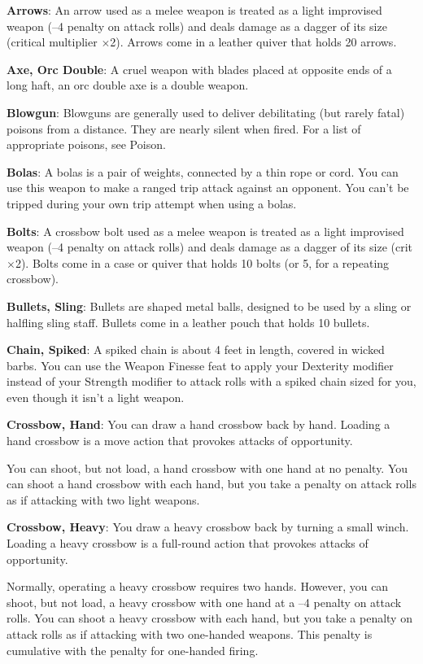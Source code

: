 \textbf{Arrows}: An arrow used as a melee weapon is treated as a light improvised weapon (--4 penalty on attack rolls) and deals damage as a dagger of its size (critical multiplier \mbox{$\times$}2). Arrows come in a leather quiver that holds 20 arrows.
		
\textbf{Axe, Orc Double}: A cruel weapon with blades placed at opposite ends of a long haft, an orc double axe is a double weapon.
		
\textbf{Blowgun}: Blowguns are generally used to deliver debilitating (but rarely fatal) poisons from a distance. They are nearly silent when fired. For a list of appropriate poisons, see Poison.
		
\textbf{Bolas}: A bolas is a pair of weights, connected by a thin rope or cord. You can use this weapon to make a ranged trip attack against an opponent. You can't be tripped during your own trip attempt when using a bolas.
		
\textbf{Bolts}: A crossbow bolt used as a melee weapon is treated as a light improvised weapon (--4 penalty on attack rolls) and deals damage as a dagger of its size (crit \mbox{$\times$}2). Bolts come in a case or quiver that holds 10 bolts (or 5, for a repeating crossbow). 
		
\textbf{Bullets, Sling}: Bullets are shaped metal balls, designed to be used by a sling or halfling sling staff. Bullets come in a leather pouch that holds 10 bullets.
		
\textbf{Chain, Spiked}: A spiked chain is about 4 feet in length, covered in wicked barbs. You can use the Weapon Finesse feat to apply your Dexterity modifier instead of your Strength modifier to attack rolls with a spiked chain sized for you, even though it isn't a light weapon.
		
\textbf{Crossbow, Hand}: You can draw a hand crossbow back by hand. Loading a hand crossbow is a move action that provokes attacks of opportunity.
		
You can shoot, but not load, a hand crossbow with one hand at no penalty. You can shoot a hand crossbow with each hand, but you take a penalty on attack rolls as if attacking with two light weapons.
		
\textbf{Crossbow, Heavy}: You draw a heavy crossbow back by turning a small winch. Loading a heavy crossbow is a full-round action that provokes attacks of opportunity.
		
Normally, operating a heavy crossbow requires two hands. However, you can shoot, but not load, a heavy crossbow with one hand at a --4 penalty on attack rolls. You can shoot a heavy crossbow with each hand, but you take a penalty on attack rolls as if attacking with two one-handed weapons. This penalty is cumulative with the penalty for one-handed firing.
		
